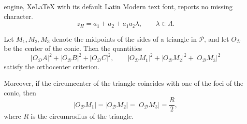 \documentclass[10pt,a4paper]{amsart}
\begin{document}
engine, XeLaTeX with its default Latin Modern text font, reports no missing character.
\begin{equation}\label{eq:zHrelation}
z_H
=
a_1+a_2+\overline{a_1a_2}\lambda,
\qquad
\lambda\in\Lambda.
\end{equation}

\begin{theorem}\label{thm:midptdist}
Let $M_1,M_2,M_3$ denote the midpoints of the sides of a triangle in $\mathcal P$, and let $O_{\mathcal D}$ be the center of the conic. Then the quantities
\[
|O_{\mathcal D}A|^2+|O_{\mathcal D}B|^2+|O_{\mathcal D}C|^2, \qquad |O_{\mathcal D}M_1|^2+|O_{\mathcal D}M_2|^2+|O_{\mathcal D}M_3|^2
\]
satisfy the orthocenter criterion.

Moreover, if the circumcenter of the triangle coincides with one of the foci of the conic, then
\[
|O_{\mathcal D}M_1|
=
|O_{\mathcal D}M_2|
=
|O_{\mathcal D}M_3|
=
\frac{R}{2},
\]
where $R$ is the circumradius of the triangle.
\end{theorem}
\end{document}
